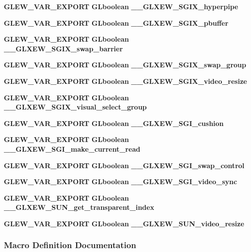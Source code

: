 \begin{DoxyCompactItemize}
\item 
{\bf G\+L\+E\+W\+\_\+\+V\+A\+R\+\_\+\+E\+X\+P\+O\+RT} {\bf G\+Lboolean} {\bf \+\_\+\+\_\+\+G\+L\+X\+E\+W\+\_\+\+S\+G\+I\+X\+\_\+hyperpipe}
\item 
{\bf G\+L\+E\+W\+\_\+\+V\+A\+R\+\_\+\+E\+X\+P\+O\+RT} {\bf G\+Lboolean} {\bf \+\_\+\+\_\+\+G\+L\+X\+E\+W\+\_\+\+S\+G\+I\+X\+\_\+pbuffer}
\item 
{\bf G\+L\+E\+W\+\_\+\+V\+A\+R\+\_\+\+E\+X\+P\+O\+RT} {\bf G\+Lboolean} {\bf \+\_\+\+\_\+\+G\+L\+X\+E\+W\+\_\+\+S\+G\+I\+X\+\_\+swap\+\_\+barrier}
\item 
{\bf G\+L\+E\+W\+\_\+\+V\+A\+R\+\_\+\+E\+X\+P\+O\+RT} {\bf G\+Lboolean} {\bf \+\_\+\+\_\+\+G\+L\+X\+E\+W\+\_\+\+S\+G\+I\+X\+\_\+swap\+\_\+group}
\item 
{\bf G\+L\+E\+W\+\_\+\+V\+A\+R\+\_\+\+E\+X\+P\+O\+RT} {\bf G\+Lboolean} {\bf \+\_\+\+\_\+\+G\+L\+X\+E\+W\+\_\+\+S\+G\+I\+X\+\_\+video\+\_\+resize}
\item 
{\bf G\+L\+E\+W\+\_\+\+V\+A\+R\+\_\+\+E\+X\+P\+O\+RT} {\bf G\+Lboolean} {\bf \+\_\+\+\_\+\+G\+L\+X\+E\+W\+\_\+\+S\+G\+I\+X\+\_\+visual\+\_\+select\+\_\+group}
\item 
{\bf G\+L\+E\+W\+\_\+\+V\+A\+R\+\_\+\+E\+X\+P\+O\+RT} {\bf G\+Lboolean} {\bf \+\_\+\+\_\+\+G\+L\+X\+E\+W\+\_\+\+S\+G\+I\+\_\+cushion}
\item 
{\bf G\+L\+E\+W\+\_\+\+V\+A\+R\+\_\+\+E\+X\+P\+O\+RT} {\bf G\+Lboolean} {\bf \+\_\+\+\_\+\+G\+L\+X\+E\+W\+\_\+\+S\+G\+I\+\_\+make\+\_\+current\+\_\+read}
\item 
{\bf G\+L\+E\+W\+\_\+\+V\+A\+R\+\_\+\+E\+X\+P\+O\+RT} {\bf G\+Lboolean} {\bf \+\_\+\+\_\+\+G\+L\+X\+E\+W\+\_\+\+S\+G\+I\+\_\+swap\+\_\+control}
\item 
{\bf G\+L\+E\+W\+\_\+\+V\+A\+R\+\_\+\+E\+X\+P\+O\+RT} {\bf G\+Lboolean} {\bf \+\_\+\+\_\+\+G\+L\+X\+E\+W\+\_\+\+S\+G\+I\+\_\+video\+\_\+sync}
\item 
{\bf G\+L\+E\+W\+\_\+\+V\+A\+R\+\_\+\+E\+X\+P\+O\+RT} {\bf G\+Lboolean} {\bf \+\_\+\+\_\+\+G\+L\+X\+E\+W\+\_\+\+S\+U\+N\+\_\+get\+\_\+transparent\+\_\+index}
\item 
{\bf G\+L\+E\+W\+\_\+\+V\+A\+R\+\_\+\+E\+X\+P\+O\+RT} {\bf G\+Lboolean} {\bf \+\_\+\+\_\+\+G\+L\+X\+E\+W\+\_\+\+S\+U\+N\+\_\+video\+\_\+resize}
\end{DoxyCompactItemize}


\subsubsection{Macro Definition Documentation}
